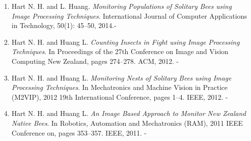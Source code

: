 \begin{enumerate}
\item Hart N. H. and L. Huang. \emph{Monitoring Populations of Solitary Bees using Image Processing Techniques}. International Journal of Computer Applications in Technology, 50(1): 45--50, 2014.- \cite{Hart2014}
\item Hart N. H. and Huang L. \emph{Counting Insects in Fight using Image Processing Techniques}. In Proceedings of the 27th Conference on Image and Vision Computing New Zealand, pages 274--278. ACM, 2012. - \cite{Hart2012}
\item Hart N. H. and Huang L. \emph{Monitoring Nests of Solitary Bees using Image Processing Techniques}. In Mechatronics and Machine Vision in Practice (M2VIP), 2012 19th International Conference, pages 1--4. IEEE, 2012. - \cite{Hart2012a}
\item Hart N. H. and Huang L. \emph{An Image Based Approach to Monitor New Zealand Native Bees}. In Robotics, Automation and Mechatronics (RAM), 2011 IEEE Conference on, pages 353--357. IEEE, 2011. - \cite{Hart2011}
\end{enumerate}


